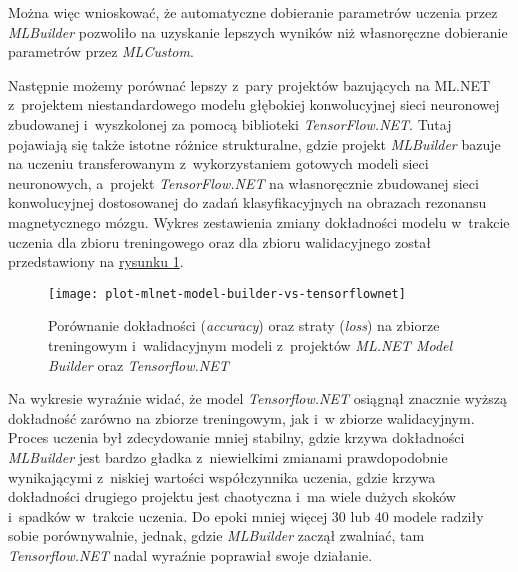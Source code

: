 Można więc wnioskować, że automatyczne dobieranie parametrów uczenia przez \emph{MLBuilder} pozwoliło na uzyskanie lepszych wyników niż własnoręczne dobieranie parametrów przez \emph{MLCustom}.

Następnie możemy porównać lepszy z~pary projektów bazujących na ML.NET z~projektem niestandardowego modelu głębokiej konwolucyjnej sieci neuronowej zbudowanej i~wyszkolonej za pomocą biblioteki \emph{TensorFlow.NET}.
Tutaj pojawiają się także istotne różnice strukturalne, gdzie projekt \emph{MLBuilder} bazuje na uczeniu transferowanym z~wykorzystaniem gotowych modeli sieci neuronowych, a~projekt \emph{TensorFlow.NET} na własnoręcznie zbudowanej sieci konwolucyjnej dostosowanej do zadań klasyfikacyjnych na obrazach rezonansu magnetycznego mózgu.
Wykres zestawienia zmiany dokładności modelu w~trakcie uczenia dla zbioru treningowego oraz dla zbioru walidacyjnego został przedstawiony na \hyperref[fig:plot-mlnet-model-builder-vs-tensorflownet]{rysunku \ref*{fig:plot-mlnet-model-builder-vs-tensorflownet}}.

\begin{figure}[ht]
  \texttt{[image: plot-mlnet-model-builder-vs-tensorflownet]}
  \caption[Porównanie dokładności oraz straty modeli ML.NET Model Builder oraz Tensorflow.NET]{Porównanie dokładności (\emph{accuracy}) oraz straty (\emph{loss}) na zbiorze treningowym i~walidacyjnym modeli z~projektów \emph{ML.NET Model Builder} oraz \emph{Tensorflow.NET}}
  \label{fig:plot-mlnet-model-builder-vs-tensorflownet}
\end{figure}

Na wykresie wyraźnie widać, że model \emph{Tensorflow.NET} osiągnął znacznie wyższą dokładność zarówno na zbiorze treningowym, jak i~w zbiorze walidacyjnym.
Proces uczenia był zdecydowanie mniej stabilny, gdzie krzywa dokładności \emph{MLBuilder} jest bardzo gładka z~niewielkimi zmianami prawdopodobnie wynikającymi z~niskiej wartości współczynnika uczenia, gdzie krzywa dokładności drugiego projektu jest chaotyczna i~ma wiele dużych skoków i~spadków w~trakcie uczenia.
Do epoki mniej więcej $30$ lub $40$ modele radziły sobie porównywalnie, jednak, gdzie \emph{MLBuilder} zaczął zwalniać, tam \emph{Tensorflow.NET} nadal wyraźnie poprawiał swoje działanie.

